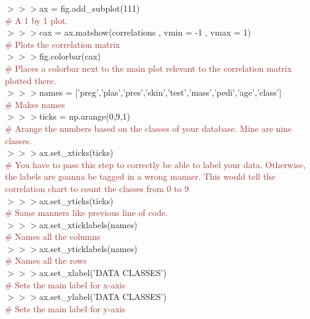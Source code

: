 \documentclass[a4paper,18pt]{article}
\begin{document}
$>>>$ax = fig.add\_subplot(111)\\{\textcolor{brown}{\# A 1 by 1 plot. }}\\

$>>>$cax = ax.matshow(correlations , vmin = -1 , vmax = 1)\\{\textcolor{brown}{\# Plots the correlation matrix}}\\

$>>>$fig.colorbar(cax)\\{\textcolor{brown}{\# Places a colorbar next to the main plot relevant to the correlation matrix plotted there.}}\\

$>>>$names = ['preg','plas','pres','skin','test','mass','pedi','age','class']\\{\textcolor{brown}{\# Makes names}}\\

$>>>$ticks = np.arange(0,9,1)\\{\textcolor{brown}{\# Arange the numbers based on the classes of your database. Mine are nine classes.}}\\

$>>>$ax.set\_xticks(ticks)\\{\textcolor{brown}{\# You have to pass this step to correctly be able to label your data. Otherwise, the labels are goanna be tagged in a wrong manner. This would tell the correlation chart to count the classes from 0 to 9}}\\

$>>>$ax.set\_yticks(ticks)\\{\textcolor{brown}{\# Same manners like previous line of code.}}\\

$>>>$ax.set\_xticklabels(names)\\{\textcolor{brown}{\# Names all the columns}}\\

$>>>$ax.set\_yticklabels(names)\\{\textcolor{brown}{\# Names all the rows}}\\

$>>>$ax.set\_xlabel('DATA CLASSES')\\{\textcolor{brown}{\# Sets the main label for x-axis}}\\

$>>>$ax.set\_ylabel('DATA CLASSES')\\{\textcolor{brown}{\# Sets the main label for y-axis}}\\
\end{document}
